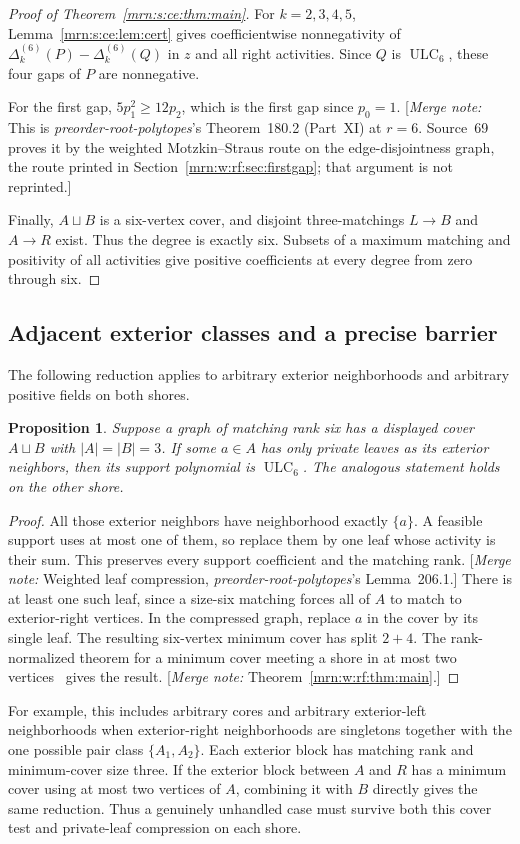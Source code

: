 \documentclass[11pt,a4paper]{article}
\newtheorem{proposition}[theorem]{Proposition}
\theoremstyle{remark}\newtheorem{remark}[theorem]{Remark}
\newcommand{\ULC}{\operatorname{ULC}}      %
\newcommand{\gap}{\Delta}                  %
\newcommand{\mnote}[1]{[\textit{Merge note:} #1]}
\newcommand{\prp}{\emph{preorder-root-polytopes}}
\begin{document}
\begin{proof}[Proof of Theorem~\ref{mrn:s:ce:thm:main}]
For $k=2,3,4,5$, Lemma~\ref{mrn:s:ce:lem:cert} gives coefficientwise nonnegativity of $\gap_k^{(6)}(P)-\gap_k^{(6)}(Q)$ in $z$ and all right activities. Since $Q$ is $\ULC_6$, these four gaps of $P$ are nonnegative.

For the first gap, $5p_1^2\ge12p_2$, which is the first gap since $p_0=1$. \mnote{This is \prp's Theorem~180.2 (Part~XI) at $r=6$. Source~69 proves it by the weighted Motzkin--Straus route on the edge-disjointness graph, the route printed in Section~\ref{mrn:w:rf:sec:firstgap}; that argument is not reprinted.}

Finally, $A\sqcup B$ is a six-vertex cover, and disjoint three-matchings $L\to B$ and $A\to R$ exist. Thus the degree is exactly six. Subsets of a maximum matching and positivity of all activities give positive coefficients at every degree from zero through six.
\end{proof}

\subsection{Adjacent exterior classes and a precise barrier}
The following reduction applies to arbitrary exterior neighborhoods and arbitrary positive fields on both shores.

\begin{proposition}\label{mrn:s:ce:prop:compression}
Suppose a graph of matching rank six has a displayed cover $A\sqcup B$ with $|A|=|B|=3$. If some $a\in A$ has only private leaves as its exterior neighbors, then its support polynomial is $\ULC_6$. The analogous statement holds on the other shore.
\end{proposition}
\begin{proof}
All those exterior neighbors have neighborhood exactly $\{a\}$. A feasible support uses at most one of them, so replace them by one leaf whose activity is their sum. This preserves every support coefficient and the matching rank. \mnote{Weighted leaf compression, \prp's Lemma~206.1.} There is at least one such leaf, since a size-six matching forces all of $A$ to match to exterior-right vertices. In the compressed graph, replace $a$ in the cover by its single leaf. The resulting six-vertex minimum cover has split $2+4$. The rank-normalized theorem for a minimum cover meeting a shore in at most two vertices~\cite{b:m74} gives the result. \mnote{Theorem~\ref{mrn:w:rf:thm:main}.}
\end{proof}
For example, this includes arbitrary cores and arbitrary exterior-left neighborhoods when exterior-right neighborhoods are singletons together with the one possible pair class $\{A_1,A_2\}$. Each exterior block has matching rank and minimum-cover size three. If the exterior block between $A$ and $R$ has a minimum cover using at most two vertices of $A$, combining it with $B$ directly gives the same reduction. Thus a genuinely unhandled case must survive both this cover test and private-leaf compression on each shore.
\end{document}
